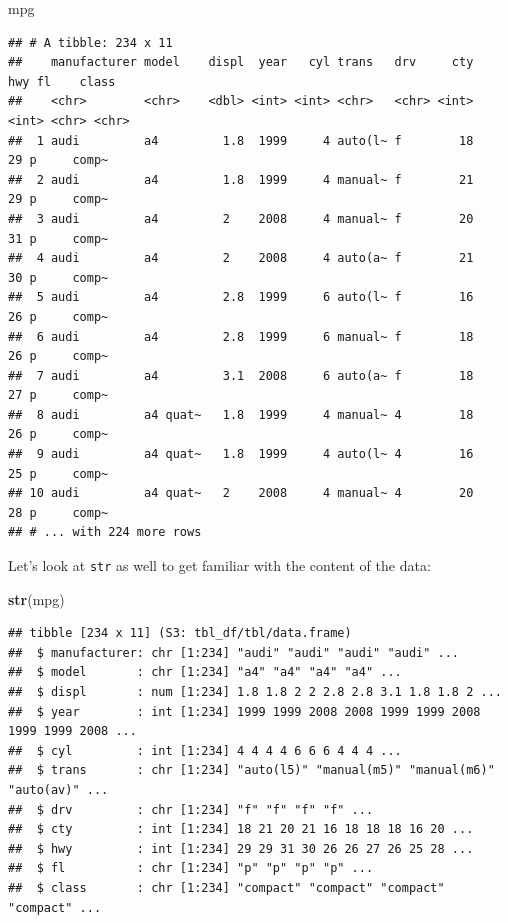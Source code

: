 \documentclass[]{book}
\newenvironment{Shaded}{\begin{snugshade}}{\end{snugshade}}
\newcommand{\KeywordTok}[1]{\textcolor[rgb]{0.13,0.29,0.53}{\textbf{#1}}}
\newcommand{\NormalTok}[1]{#1}
\begin{document}
\begin{Shaded}
\begin{Highlighting}[]
\NormalTok{mpg}
\end{Highlighting}
\end{Shaded}

\begin{verbatim}
## # A tibble: 234 x 11
##    manufacturer model    displ  year   cyl trans   drv     cty   hwy fl    class
##    <chr>        <chr>    <dbl> <int> <int> <chr>   <chr> <int> <int> <chr> <chr>
##  1 audi         a4         1.8  1999     4 auto(l~ f        18    29 p     comp~
##  2 audi         a4         1.8  1999     4 manual~ f        21    29 p     comp~
##  3 audi         a4         2    2008     4 manual~ f        20    31 p     comp~
##  4 audi         a4         2    2008     4 auto(a~ f        21    30 p     comp~
##  5 audi         a4         2.8  1999     6 auto(l~ f        16    26 p     comp~
##  6 audi         a4         2.8  1999     6 manual~ f        18    26 p     comp~
##  7 audi         a4         3.1  2008     6 auto(a~ f        18    27 p     comp~
##  8 audi         a4 quat~   1.8  1999     4 manual~ 4        18    26 p     comp~
##  9 audi         a4 quat~   1.8  1999     4 auto(l~ 4        16    25 p     comp~
## 10 audi         a4 quat~   2    2008     4 manual~ 4        20    28 p     comp~
## # ... with 224 more rows
\end{verbatim}

Let's look at \texttt{str} as well to get familiar with the content of
the data:

\begin{Shaded}
\begin{Highlighting}[]
\KeywordTok{str}\NormalTok{(mpg)}
\end{Highlighting}
\end{Shaded}

\begin{verbatim}
## tibble [234 x 11] (S3: tbl_df/tbl/data.frame)
##  $ manufacturer: chr [1:234] "audi" "audi" "audi" "audi" ...
##  $ model       : chr [1:234] "a4" "a4" "a4" "a4" ...
##  $ displ       : num [1:234] 1.8 1.8 2 2 2.8 2.8 3.1 1.8 1.8 2 ...
##  $ year        : int [1:234] 1999 1999 2008 2008 1999 1999 2008 1999 1999 2008 ...
##  $ cyl         : int [1:234] 4 4 4 4 6 6 6 4 4 4 ...
##  $ trans       : chr [1:234] "auto(l5)" "manual(m5)" "manual(m6)" "auto(av)" ...
##  $ drv         : chr [1:234] "f" "f" "f" "f" ...
##  $ cty         : int [1:234] 18 21 20 21 16 18 18 18 16 20 ...
##  $ hwy         : int [1:234] 29 29 31 30 26 26 27 26 25 28 ...
##  $ fl          : chr [1:234] "p" "p" "p" "p" ...
##  $ class       : chr [1:234] "compact" "compact" "compact" "compact" ...
\end{verbatim}
\end{document}
